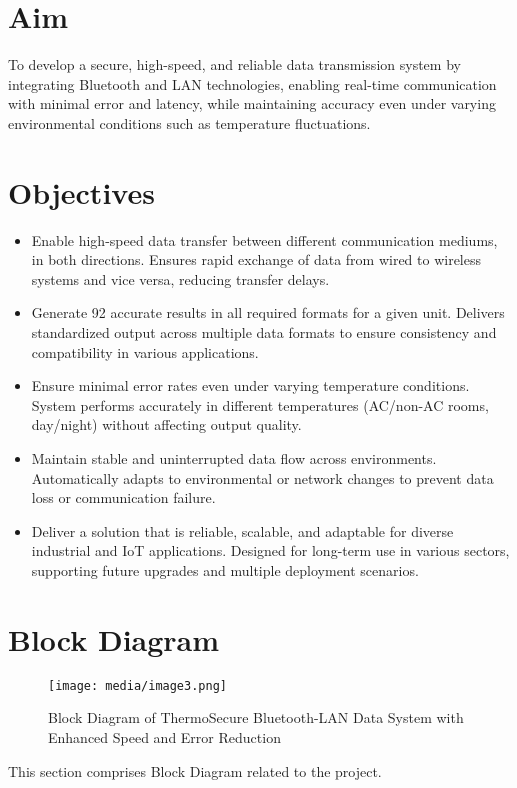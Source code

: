 \documentclass[12pt]{report}
\begin{document}
\section{Aim}
\begin{flushleft}
To develop a secure, high-speed, and reliable data transmission system by integrating Bluetooth and LAN technologies, enabling real-time communication with minimal error and latency, while maintaining accuracy even under varying environmental conditions such as temperature fluctuations.
\end{flushleft}

\section{Objectives}
\begin{flushleft}
\begin{itemize}[leftmargin=*]
    \item Enable high-speed data transfer between different communication mediums, in both directions. Ensures rapid exchange of data from wired to wireless systems and vice versa, reducing transfer delays.
    \item Generate 92 accurate results in all required formats for a given unit. Delivers standardized output across multiple data formats to ensure consistency and compatibility in various applications.
    \item Ensure minimal error rates even under varying temperature conditions. System performs accurately in different temperatures (AC/non-AC rooms, day/night) without affecting output quality.
    \item Maintain stable and uninterrupted data flow across environments. Automatically adapts to environmental or network changes to prevent data loss or communication failure.
    \item Deliver a solution that is reliable, scalable, and adaptable for diverse industrial and IoT applications. Designed for long-term use in various sectors, supporting future upgrades and multiple deployment scenarios.
\end{itemize}
\end{flushleft}

\clearpage
{\raggedright
\section{Block Diagram}
}
\begin{figure}[ht]
    \centering
    \texttt{[image: media/image3.png]}
    \caption{Block Diagram of ThermoSecure Bluetooth-LAN Data System with Enhanced Speed and Error Reduction}
    \label{fig:block_diagram}
\end{figure}
\begin{flushleft}
This section comprises Block Diagram related to the project.
\end{flushleft}
\end{document}
